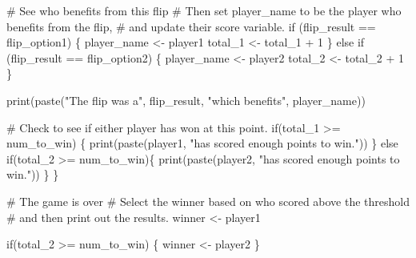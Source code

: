 \documentclass[
  letterpaper,
  DIV=11,
  numbers=noendperiod]{scrreprt}
\newenvironment{Shaded}{\begin{snugshade}}{\end{snugshade}}
\newcommand{\CommentTok}[1]{\textcolor[rgb]{0.37,0.37,0.37}{#1}}
\newcommand{\ControlFlowTok}[1]{\textcolor[rgb]{0.00,0.23,0.31}{#1}}
\newcommand{\DecValTok}[1]{\textcolor[rgb]{0.68,0.00,0.00}{#1}}
\newcommand{\FunctionTok}[1]{\textcolor[rgb]{0.28,0.35,0.67}{#1}}
\newcommand{\NormalTok}[1]{\textcolor[rgb]{0.00,0.23,0.31}{#1}}
\newcommand{\OtherTok}[1]{\textcolor[rgb]{0.00,0.23,0.31}{#1}}
\newcommand{\SpecialCharTok}[1]{\textcolor[rgb]{0.37,0.37,0.37}{#1}}
\newcommand{\StringTok}[1]{\textcolor[rgb]{0.13,0.47,0.30}{#1}}
\theoremstyle{definition}
\theoremstyle{definition}
\theoremstyle{definition}
\theoremstyle{remark}
\begin{document}
\begin{Shaded}
\begin{Highlighting}[]
    \CommentTok{\# See who benefits from this flip}
    \CommentTok{\# Then set player\_name to be the player who benefits from the flip,}
    \CommentTok{\# and update their score variable.}
    \ControlFlowTok{if}\NormalTok{ (flip\_result }\SpecialCharTok{==}\NormalTok{ flip\_option1) \{}
\NormalTok{        player\_name }\OtherTok{\textless{}{-}}\NormalTok{ player1}
\NormalTok{        total\_1 }\OtherTok{\textless{}{-}}\NormalTok{ total\_1 }\SpecialCharTok{+} \DecValTok{1}
\NormalTok{    \} }\ControlFlowTok{else} \ControlFlowTok{if}\NormalTok{ (flip\_result }\SpecialCharTok{==}\NormalTok{ flip\_option2) \{}
\NormalTok{        player\_name }\OtherTok{\textless{}{-}}\NormalTok{ player2}
\NormalTok{        total\_2 }\OtherTok{\textless{}{-}}\NormalTok{ total\_2 }\SpecialCharTok{+} \DecValTok{1}
\NormalTok{    \}}

    \FunctionTok{print}\NormalTok{(}\FunctionTok{paste}\NormalTok{(}\StringTok{"The flip was a"}\NormalTok{, flip\_result, }\StringTok{"which benefits"}\NormalTok{, player\_name))}

    \CommentTok{\# Check to see if either player has won at this point.}
    \ControlFlowTok{if}\NormalTok{(total\_1 }\SpecialCharTok{\textgreater{}=}\NormalTok{ num\_to\_win) \{}
        \FunctionTok{print}\NormalTok{(}\FunctionTok{paste}\NormalTok{(player1, }\StringTok{"has scored enough points to win."}\NormalTok{))}
\NormalTok{    \} }\ControlFlowTok{else} \ControlFlowTok{if}\NormalTok{(total\_2 }\SpecialCharTok{\textgreater{}=}\NormalTok{ num\_to\_win)\{}
        \FunctionTok{print}\NormalTok{(}\FunctionTok{paste}\NormalTok{(player2, }\StringTok{"has scored enough points to win."}\NormalTok{))}
\NormalTok{    \}}
\NormalTok{\}}

\CommentTok{\# The game is over}
\CommentTok{\# Select the winner based on who scored above the threshold }
\CommentTok{\# and then print out the results.}
\NormalTok{winner }\OtherTok{\textless{}{-}}\NormalTok{ player1 }

\ControlFlowTok{if}\NormalTok{(total\_2 }\SpecialCharTok{\textgreater{}=}\NormalTok{ num\_to\_win) \{}
\NormalTok{    winner }\OtherTok{\textless{}{-}}\NormalTok{ player2 }
\NormalTok{\}}


\end{Highlighting}
\end{Shaded}
\end{document}
